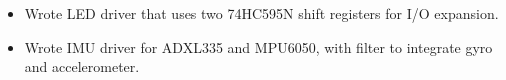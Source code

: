 \documentclass{resume}
\begin{document}
\begin{itemize}
  \item Wrote LED driver that uses two 74HC595N shift registers for I/O expansion.
  \item Wrote IMU driver for ADXL335 and MPU6050, with filter to integrate gyro and accelerometer.
\end{itemize}

\begin{comment}
\datedsubsection{\textbf{Hackathons}}{Various}
\begin{itemize}
  \item \href{https://github.com/DChang87/HtN}{Pebble-run dosage notification service - \textit{SmartMeds}; used C.} \hfill Hack the North, 2015
  \item \href{jkkd.com}{IMU-based instructor - \textit{Yoga Yoda}; developed business case. \hfill} PCH Hardware Hackathon, 2015
  \item \href{http://devpost.com/software/drumyo}{Myo-controlled air drum kit - \textit{DruMyo}; used C++. \hfill} hackWaterloo, 2014
  \item \href{https://github.com/fanwashere/SolidWorksControls}{Myo-enabled Solidworks controller; used Lua. \hfill} Hack the North, 2014
\end{itemize}
\end{comment}
\end{document}
